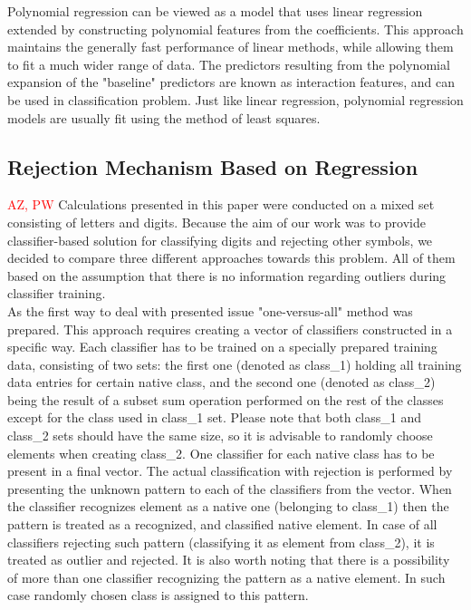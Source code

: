 \documentclass{llncs}
\begin{document}
Polynomial regression can be viewed as a model that uses linear regression extended by constructing polynomial features from the coefficients. This approach maintains the generally fast performance of linear methods, while allowing them to fit a much wider range of data. The predictors resulting from the polynomial expansion of the "baseline" predictors are known as interaction features, and can be used in classification problem. Just like linear regression, polynomial regression models are usually fit using the method of least squares. \\





\subsection{Rejection Mechanism Based on Regression}
\textcolor{red} {AZ, PW}
Calculations presented in this paper were conducted on a mixed set consisting of letters and digits. Because the aim of our work was to provide classifier-based solution for classifying digits and rejecting other symbols, we decided to compare three different approaches towards this problem. All of them based on the assumption that there is no information regarding outliers during classifier training. \\

As the first way to deal with presented issue "one-versus-all" method was prepared. This approach requires creating a vector of classifiers constructed in a specific way. Each classifier has to be trained on a specially prepared training data, consisting of two sets: the first one (denoted as class\_1) holding all training data entries for certain native class, and the second one (denoted as class\_2) being the result of a subset sum operation performed on the rest of the classes except for the class used in class\_1 set. Please note that both class\_1 and class\_2 sets should have the same size, so it is advisable to randomly choose elements when creating class\_2. One classifier for each native class has to be present in a final vector. The actual classification with rejection is performed by presenting the unknown pattern to each of the classifiers from the vector. When the classifier recognizes element as a native one (belonging to class\_1) then the pattern is treated as a recognized, and classified native element. In case of all classifiers rejecting such pattern (classifying it as element from class\_2), it is treated as outlier and rejected. It is also worth noting that there is a possibility of more than one classifier recognizing the pattern as a native element. In such case randomly chosen class is assigned to this pattern. \\
\end{document}
